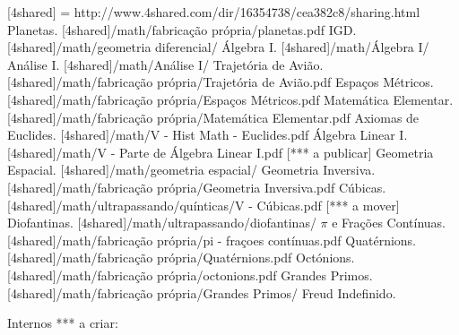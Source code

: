 \documentclass[12pt,a4paper]{article}
\begin{document}
\begin{thebibliography}{15}
		 [4shared] = http://www.4shared.com/dir/16354738/cea382c8/sharing.html
		 Planetas. [4shared]/math/fabrica\c{c}\~ao pr\'opria/planetas.pdf
		 IGD. [4shared]/math/geometria diferencial/
		 \'Algebra I. [4shared]/math/\'Algebra I/
		 An\'alise I. [4shared]/math/An\'alise I/
		 Trajet\'oria de Avi\~ao. [4shared]/math/fabrica\c{c}\~ao pr\'opria/Trajet\'oria de Avi\~ao.pdf
		 Espa\c{c}os M\'etricos. [4shared]/math/fabrica\c{c}\~ao pr\'opria/Espa\c{c}os M\'etricos.pdf
		 Matem\'atica Elementar. [4shared]/math/fabrica\c{c}\~ao pr\'opria/Matem\'atica Elementar.pdf
		 Axiomas de Euclides. [4shared]/math/V - Hist Math - Euclides.pdf
		 \'Algebra Linear I. [4shared]/math/V - Parte de \'Algebra Linear I.pdf [*** a publicar]
		 Geometria Espacial. [4shared]/math/geometria espacial/
		 Geometria Inversiva. [4shared]/math/fabrica\c{c}\~ao pr\'opria/Geometria Inversiva.pdf
		 C\'ubicas. [4shared]/math/ultrapassando/qu\'inticas/V - C\'ubicas.pdf [*** a mover]
		 Diofantinas. [4shared]/math/ultrapassando/diofantinas/
		 $ \pi $ e Fra\c{c}\~oes Cont\'inuas. [4shared]/math/fabrica\c{c}\~ao pr\'opria/pi - fra\c{c}oes cont\'inuas.pdf
		 Quat\'ernions. [4shared]/math/fabrica\c{c}\~ao pr\'opria/Quat\'ernions.pdf
		 Oct\'onions. [4shared]/math/fabrica\c{c}\~ao pr\'opria/octonions.pdf
		 Grandes Primos. [4shared]/math/fabrica\c{c}\~ao pr\'opria/Grandes Primos/
		 Freud
		 Indefinido.

		\begin{flushright}
		\end{flushright}

		Internos *** a criar:


\end{thebibliography}
\end{document}
